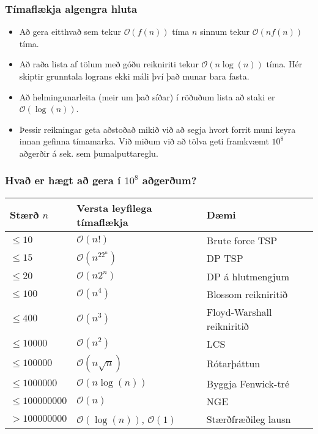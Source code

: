 \documentclass{beamer}
\begin{document}
\begin{frame}
\frametitle{Tímaflækja algengra hluta}

\begin{itemize}

\item<1-> Að gera eitthvað sem tekur $\mathcal{O}(f(n))$ tíma $n$ sinnum tekur $\mathcal{O}(nf(n))$ tíma.

\item<2-> Að raða lista af tölum með góðu reikniriti tekur $\mathcal{O}(n\log(n))$ tíma. Hér skiptir grunntala lograns ekki máli því það munar bara fasta.

\item<3-> Að helmingunarleita (meir um það síðar) í röðuðum lista að staki er $\mathcal{O}(\log(n))$.

\item<4-> Þessir reikningar geta aðstoðað mikið við að segja hvort forrit muni keyra innan gefinna tímamarka. Við miðum við að tölva geti framkvæmt $10^8$ aðgerðir á sek. sem þumalputtareglu.

\end{itemize}

\end{frame}

\begin{frame}
\frametitle{Hvað er hægt að gera í $10^8$ aðgerðum?}

\begin{tabular}{l|l|l}
Stærð $n$ & Versta leyfilega tímaflækja & Dæmi \\ \hline
$\leq 10$ & $\mathcal{O}(n!)$ & Brute force TSP\\
$\leq 15$ & $\mathcal{O}(n^22^n)$ & DP TSP\\ 
$\leq 20$ & $\mathcal{O}(n2^n)$ & DP á hlutmengjum\\
$\leq 100$ & $\mathcal{O}(n^4)$ & Blossom reikniritið\\
$\leq 400$ & $\mathcal{O}(n^3)$ & Floyd-Warshall reikniritið\\
$\leq 10000$ & $\mathcal{O}(n^2)$ & LCS\\
$\leq 100000$ & $\mathcal{O}(n\sqrt{n})$ & Rótarþáttun\\
$\leq 1000000$ & $\mathcal{O}(n\log(n))$ & Byggja Fenwick-tré\\
$\leq 100000000$ & $\mathcal{O}(n)$ & NGE\\
$> 100000000$ & $\mathcal{O}(\log(n))$, $\mathcal{O}(1)$ & Stærðfræðileg lausn\\
\end{tabular}

\end{frame}
\end{document}
